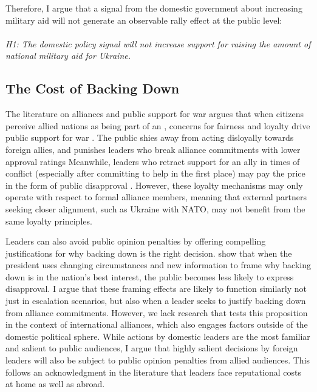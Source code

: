 Therefore, I argue that a signal from the domestic government about increasing military aid will not generate an observable rally effect at the public level: 
\paragraph{}
\textit{H1: The domestic policy signal will not increase support for raising the amount of national military aid for Ukraine.}

\subsection{The Cost of Backing Down}
The literature on alliances and public support for war argues that when citizens perceive allied nations as being part of an , concerns for fairness and loyalty drive public support for war \autocite{tomz&weeks2021, tomzNATO2023}. The public shies away from acting disloyally towards foreign allies, and punishes leaders who break alliance commitments with lower approval ratings \autocite{chiba_careful_2015, tomz&weeks2021, levin_art_2022} Meanwhile, leaders who retract support for an ally in times of conflict (especially after committing to help in the first place) may pay the price in the form of public disapproval \autocite{tomz&weeks2021}. However, these loyalty mechanisms may only operate with respect to formal alliance members, meaning that external partners seeking closer alignment, such as Ukraine with NATO, may not benefit from the same loyalty principles.

Leaders can also avoid public opinion penalties by offering compelling justifications for why backing down is the right decision. \textcite{levendusky_when_2012} show that when the president uses changing circumstances and new information to frame why backing down is in the nation's best interest, the public becomes less likely to express disapproval. I argue that these framing effects are likely to function similarly not just in escalation scenarios, but also when a leader seeks to justify backing down from alliance commitments. However, we lack research that tests this proposition in the context of international alliances, which also engages factors outside of the domestic political sphere. While actions by domestic leaders are the most familiar and salient to public audiences, I argue that highly salient decisions by foreign leaders will also be subject to public opinion penalties from allied audiences. This follows an acknowledgment in the literature that leaders face reputational costs at home as well as abroad. \autocite{levy_backing_2015, agadjanian_has_2020} 

